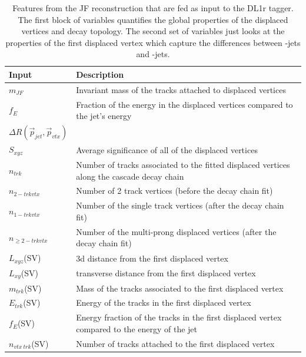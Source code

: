 \begin{table}[h!]
\centering
\begin{tabular}{p{2cm} | p{12cm}  } 
\textbf{Input} & \textbf{Description}  \\
\hline
\hline
	 $m_{JF}$ & Invariant mass of the tracks attached to displaced vertices \\
	 $f_E$ & Fraction of the energy in the displaced vertices compared to the jet's energy \\
	 $\Delta R(\vec{p}_{jet}, \vec{p}_{vtx})$ & \\
	 $S_{xyz}$ & Average significance of all of the displaced vertices \\
	$n_{trk}$ & Number of tracks associated to the fitted displaced vertices along the cascade decay chain \\
	$n_{2-trk vtx}$ & Number of 2 track vertices (before the decay chain fit) \\
	$n_{1-trk vtx}$ & Number of the single track vertices (after the decay chain fit) \\
	$n_{\geq 2-trk vtx}$ & Number of the multi-prong displaced vertices (after the decay chain fit) \\
	\hline
	$L_{xyz}$(SV) & 3d distance from the first displaced vertex  \\
	$L_{xy}$(SV) &  transverse distance from the first displaced vertex \\
	$m_{trk}$(SV) & Mass of the tracks associated to the first displaced vertex \\
	$E_{trk}$(SV) & Energy of the tracks in the first displaced vertex \\
	$f_E$(SV) & Energy fraction of the tracks in the first displaced vertex compared to the energy of the jet \\ 
	$n_{vtx \ trk}$(SV) & Number of tracks attached to the first displaced vertex \\
\end{tabular}
\caption{Features from the JF reconstruction that are fed as input to the DL1r tagger. The first block of variables quantifies the global properties of the displaced vertices and decay topology. The second set of variables just looks at the properties of the first displaced vertex which capture the differences between \Pqb-jets and \Pqc-jets.}
\label{table:jf-inputs}
\end{table}


